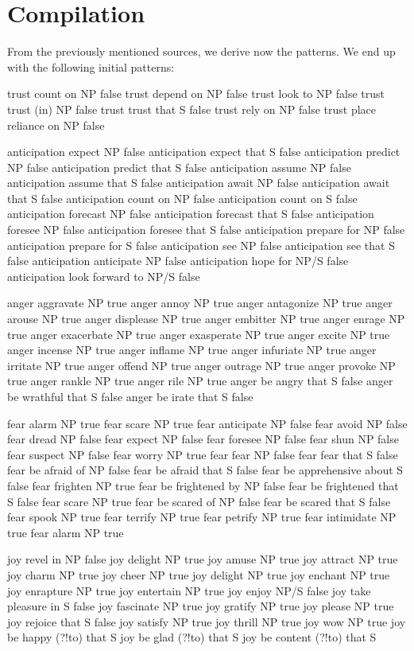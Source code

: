 \section{Compilation}

From the previously mentioned sources, we derive now the patterns. We end up with the following initial patterns:

trust	count on	NP	false
trust	depend on	NP	false
trust	look to	NP	false
trust	trust (in)	NP	false
trust	trust that	S	false
trust	rely on	NP	false
trust	place reliance on	NP	false

anticipation	expect	NP	false
anticipation	expect that	S	false
anticipation	predict	NP	false
anticipation	predict that	S	false
anticipation	assume NP	false
anticipation	assume that	S	false
anticipation	await	NP	false
anticipation	await	that S	false
anticipation	count on	NP	false
anticipation	count on	S	false
anticipation	forecast	NP	false
anticipation	forecast that S	false
anticipation	foresee	NP	false
anticipation	foresee that	S	false
anticipation	prepare for	NP	false
anticipation	prepare for	S	false
anticipation	see	NP	false
anticipation	see that	S	false
anticipation	anticipate	NP	false
anticipation	hope for	NP/S	false
anticipation	look forward to	NP/S	false


anger	aggravate	NP	true
anger	annoy	NP	true
anger	antagonize	NP	true
anger	arouse	NP	true
anger	displease	NP	true
anger	embitter	NP	true
anger	enrage	NP	true
anger	exacerbate	NP	true
anger	exasperate	NP	true
anger	excite	NP	true
anger	incense	NP	true
anger	inflame	NP	true
anger	infuriate	NP	true
anger	irritate		NP	true
anger	offend	NP	true
anger	outrage	NP	true
anger	provoke	NP	true
anger	rankle	NP	true
anger	rile	NP	true
anger	be angry that	S	false
anger	be wrathful that	S	false
anger	be irate that	S	false

fear	alarm	NP	true
fear	scare	NP	true
fear	anticipate	NP	false
fear	avoid	NP	false
fear	dread	NP	false
fear	expect	NP	false
fear	foresee	NP	false
fear	shun	NP	false
fear	suspect	NP	false
fear	worry	NP	true
fear	fear	NP	false
fear	fear that	S	false
fear	be afraid of	NP	false
fear	be afraid that	S	false
fear	be apprehensive about	S	false
fear	frighten	NP	true
fear	be frightened by	NP	false
fear	be frightened that	S	false
fear	scare	NP	true
fear	be scared of	NP	false
fear	be scared that	S	false
fear	spook	NP	true
fear	terrify	NP	true
fear	petrify	NP	true
fear	intimidate	NP	true
fear	alarm	NP	true

joy	revel in	NP	false
joy	delight	NP	true
joy	amuse	NP	true
joy	attract	NP	true
joy	charm	NP	true
joy	cheer	NP	true
joy	delight	NP	true
joy	enchant	NP	true
joy	enrapture	NP	true
joy	entertain	NP	true
joy	enjoy	NP/S	false
joy	take pleasure in	S	false
joy	fascinate	NP	true
joy	gratify	NP	true
joy	please	NP	true
joy	rejoice	that	S	false
joy	satisfy	NP	true
joy	thrill	NP	true
joy	wow	NP	true
joy	be happy (?!to) that	S
joy	be glad (?!to) that	S
joy	be content (?!to) that	S


